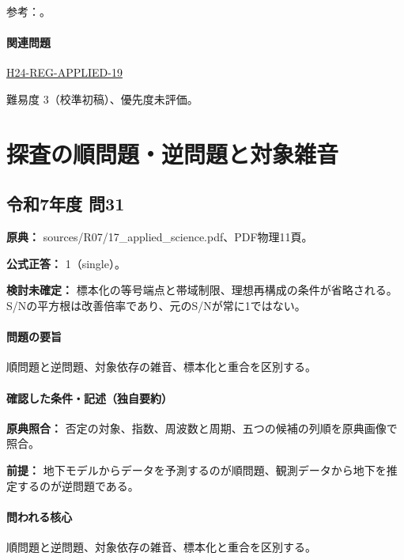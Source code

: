 \par 参考：\cite{mit_signals2010,mit_moving2012,scipy_notch,scipy_fft,usgs_processing2000}。

\paragraph{関連問題} \hyperref[q:h24-reg-applied-19]{H24-REG-APPLIED-19}

\par 難易度 3（校準初稿）、優先度未評価。

\section{探査の順問題・逆問題と対象雑音}

\subsection{令和7年度 問31}
\label{q:r07-reg-applied-31}

\noindent\textbf{原典：} sources/R07/17\_applied\_science.pdf、PDF物理11頁。

\textbf{公式正答：} 1（single）。

\par\textbf{検討未確定：} 標本化の等号端点と帯域制限、理想再構成の条件が省略される。S/Nの平方根は改善倍率であり、元のS/Nが常に1ではない。

\paragraph{問題の要旨} 順問題と逆問題、対象依存の雑音、標本化と重合を区別する。

\paragraph{確認した条件・記述（独自要約）}\mbox{}\par

\noindent\textbf{原典照合：} 否定の対象、指数、周波数と周期、五つの候補の列順を原典画像で照合。\par

\noindent\textbf{前提：} 地下モデルからデータを予測するのが順問題、観測データから地下を推定するのが逆問題である。\par

\paragraph{問われる核心} 順問題と逆問題、対象依存の雑音、標本化と重合を区別する。

